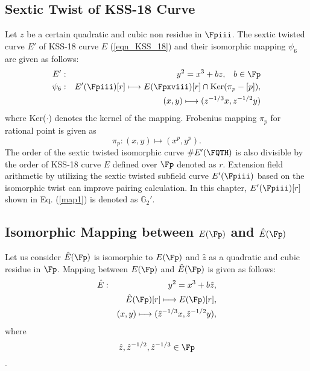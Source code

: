 \subsection{Sextic Twist of KSS-18 Curve }
Let $z$ be a certain quadratic and cubic non residue in  $\Fpiii$. 
The sextic twisted curve $E'$ of KSS-18 curve $E$ (\eqref{eqn_KSS_18}) and  their isomorphic mapping $\psi_6$ are given as follows:
\begin{eqnarray}
	E'&:&y^2=x^3+bz,\;\;\;b\in\Fp\nonumber\\
	\psi_6&:&E'(\Fpiii)[r] \longmapsto E(\Fpxviii)[r]\cap {\rm Ker}(\pi_p-[p]),\nonumber\\
	&&(x,y)\longmapsto (z^{-1/3}x,z^{-1/2}y)\label{map1}
\end{eqnarray}
where Ker($\cdot$) denotes the kernel of the mapping. Frobenius mapping $\pi_p$ for rational point is given as
\begin{equation}
	\pi_p : (x,y) \longmapsto (x^p,y^p).
\end{equation}
The order of the sextic twisted isomorphic curve $\#E'(\FQTH)$  is also divisible by the order of KSS-18 curve $E$ defined over $\Fp$ denoted as $r$. Extension field arithmetic by utilizing the sextic twisted subfield curve $E'(\Fpiii)$ based on the isomorphic twist can improve pairing calculation. In this chapter, $E'(\Fpiii)[r]$ shown in Eq. (\ref{map1}) is denoted as $\mathbb{G}_2'$.

\subsection{Isomorphic Mapping  between \texorpdfstring{$E(\Fp)$ and $\hat{E}(\Fp)$} {}} 
Let us consider $\hat{E}(\Fp)$  is isomorphic to $E(\Fp)$ and $\hat{z}$ as a quadratic and cubic residue in $\Fp$. Mapping between $E(\Fp)$ and $\hat{E}(\Fp)$ is given as follows:
\begin{eqnarray}
	\hat{E}&:&y^2=x^3+b\hat{z},\nonumber\\
	&&\hat{E}(\Fp)[r]\longmapsto E(\Fp)[r],\nonumber\\
	&&(x,y)\longmapsto (\hat{z}^{-1/3}x,\hat{z}^{-1/2}y),\nonumber
\end{eqnarray}
where $$\hat{z}, \hat{z}^{-1/2},\hat{z}^{-1/3} \in \Fp$$ \label{map2}.
